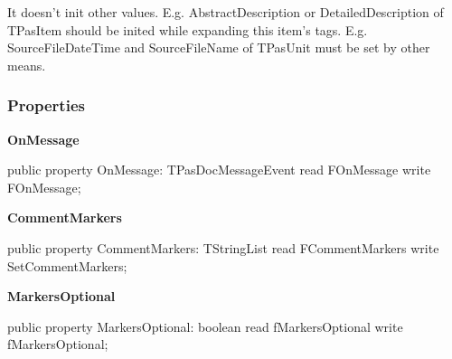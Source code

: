 \documentclass{report}
\newif\ifpdf
\begin{document}
It doesn't init other values. E.g. AbstractDescription or DetailedDescription of TPasItem should be inited while expanding this item's tags. E.g. SourceFileDateTime and SourceFileName of TPasUnit must be set by other means.\subsubsection*{\large{\textbf{Properties}}\normalsize\hspace{1ex}\hfill}
\begin{list}{}{
\setlength{\itemindent}{0cm}
\setlength{\listparindent}{0cm}
\setlength{\leftmargin}{\evensidemargin}
\addtolength{\leftmargin}{\tmplength}
\settowidth{\labelsep}{X}
\addtolength{\leftmargin}{\labelsep}
\setlength{\labelwidth}{\tmplength}
}
\label{PasDoc_Parser.TParser-OnMessage}
\item[\textbf{OnMessage}\hfill]
\ifpdf
\begin{flushleft}
\fi
\begin{ttfamily}
public property OnMessage: TPasDocMessageEvent read FOnMessage write FOnMessage;\end{ttfamily}

\ifpdf
\end{flushleft}
\fi


\par  \label{PasDoc_Parser.TParser-CommentMarkers}
\item[\textbf{CommentMarkers}\hfill]
\ifpdf
\begin{flushleft}
\fi
\begin{ttfamily}
public property CommentMarkers: TStringList read FCommentMarkers write SetCommentMarkers;\end{ttfamily}

\ifpdf
\end{flushleft}
\fi


\par  \label{PasDoc_Parser.TParser-MarkersOptional}
\item[\textbf{MarkersOptional}\hfill]
\ifpdf
\begin{flushleft}
\fi
\begin{ttfamily}
public property MarkersOptional: boolean read fMarkersOptional write fMarkersOptional;\end{ttfamily}

\ifpdf
\end{flushleft}
\fi



\end{list}
\end{document}
